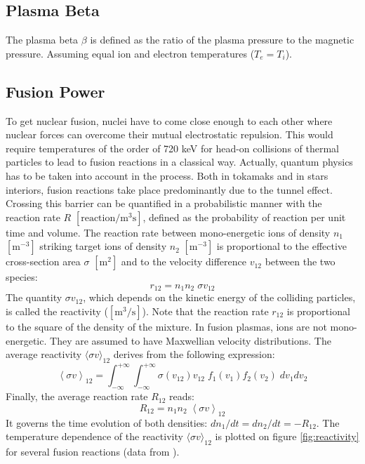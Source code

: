 \subsection{Plasma Beta}
The plasma beta $\beta$ is defined as the ratio of the plasma pressure to the magnetic pressure. Assuming equal ion and electron temperatures ($T_e=T_i$).

\subsection{Fusion Power}
To get nuclear fusion, nuclei have to come close enough to each other where nuclear forces can overcome their mutual electrostatic repulsion. This would require temperatures of the order of 720 keV for head-on collisions of thermal particles to lead to fusion reactions in a classical way. Actually, quantum physics has to be taken into account in the process. Both in tokamaks and in stars interiors, fusion reactions take place predominantly due to the tunnel effect. Crossing this barrier can be quantified in a probabilistic manner with the reaction rate $R$ $[\mathrm{reaction/m^3 s}]$, defined as the probability of reaction per unit time and volume. The reaction rate between mono-energetic ions of density $n_1$ $\mathrm{[m^{-3}]}$ striking target ions of density $n_2$ $\mathrm{[m^{-3}]}$ is proportional to the effective cross-section area $\sigma$ $\mathrm{[m^2]}$ and to the velocity difference $v_{12}$ between the two species:
\begin{equation*}
r_{12} = n_1 n_2 \; \sigma v_{12}
\end{equation*}
The quantity  $\sigma v_{12}$, which depends on the kinetic energy of the colliding particles, is called the reactivity ($\mathrm{[m^3/s]}$). Note that the reaction rate $r_{12}$ is proportional to the square of the density of the mixture. In fusion plasmas, ions are not mono-energetic. They are assumed to have Maxwellian velocity distributions. The average reactivity $\langle \sigma v \rangle_{12}$ derives from the following expression:
\begin{equation*}
\left < \sigma v \right >_{12} 
= \int_{-\infty}^{+\infty} \int_{-\infty}^{+\infty} 
\sigma(v_{12}) v_{12}\;  f_1(v_1) f_2(v_2) \; dv_1dv_2
\end{equation*}
Finally, the average reaction rate $R_{12}$ reads:
\begin{equation*}
R_{12} = n_1 n_2 \; \left < \sigma v \right >_{12}
\end{equation*}
It governs the time evolution of both densities: $dn_1/dt = dn_2/dt = -R_{12}$.
The temperature dependence of the reactivity $\langle \sigma v \rangle_{12}$ is plotted on figure \ref{fig:reactivity} for several fusion reactions (data from \cite{Huba2013}).


